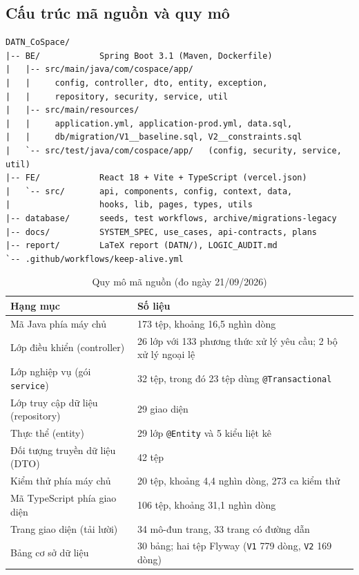 \subsection{Cấu trúc mã nguồn và quy mô}
\label{ssec:ht_cautruc}

\begin{verbatim}
DATN_CoSpace/
|-- BE/            Spring Boot 3.1 (Maven, Dockerfile)
|   |-- src/main/java/com/cospace/app/
|   |     config, controller, dto, entity, exception,
|   |     repository, security, service, util
|   |-- src/main/resources/
|   |     application.yml, application-prod.yml, data.sql,
|   |     db/migration/V1__baseline.sql, V2__constraints.sql
|   `-- src/test/java/com/cospace/app/   (config, security, service, util)
|-- FE/            React 18 + Vite + TypeScript (vercel.json)
|   `-- src/       api, components, config, context, data,
|                  hooks, lib, pages, types, utils
|-- database/      seeds, test workflows, archive/migrations-legacy
|-- docs/          SYSTEM_SPEC, use_cases, api-contracts, plans
|-- report/        LaTeX report (DATN/), LOGIC_AUDIT.md
`-- .github/workflows/keep-alive.yml
\end{verbatim}

\begin{table}[H]
\centering
\caption{Quy mô mã nguồn (đo ngày 21/09/2026)}
\label{tab:ht_quymo}
\small
\renewcommand{\arraystretch}{1.25}
\begin{tabular}{|p{6.2cm}|p{7.6cm}|}
\hline
\textbf{Hạng mục} & \textbf{Số liệu} \\
\hline
Mã Java phía máy chủ & 173 tệp, khoảng 16,5 nghìn dòng \\
\hline
Lớp điều khiển (controller) & 26 lớp với 133 phương thức xử lý yêu cầu; 2 bộ xử lý ngoại lệ \\
\hline
Lớp nghiệp vụ (gói \texttt{service}) & 32 tệp, trong đó 23 tệp dùng \texttt{@Transactional} \\
\hline
Lớp truy cập dữ liệu (repository) & 29 giao diện \\
\hline
Thực thể (entity) & 29 lớp \texttt{@Entity} và 5 kiểu liệt kê \\
\hline
Đối tượng truyền dữ liệu (DTO) & 42 tệp \\
\hline
Kiểm thử phía máy chủ & 20 tệp, khoảng 4,4 nghìn dòng, 273 ca kiểm thử \\
\hline
Mã TypeScript phía giao diện & 106 tệp, khoảng 31,1 nghìn dòng \\
\hline
Trang giao diện (tải lười) & 34 mô-đun trang, 33 trang có đường dẫn \\
\hline
Bảng cơ sở dữ liệu & 30 bảng; hai tệp Flyway (\texttt{V1} 779 dòng, \texttt{V2} 169 dòng) \\
\hline
\end{tabular}
\end{table}

